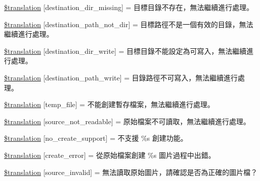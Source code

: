\begin{DoxyCompactItemize}
\item 
\hyperlink{class_8upload_8zh___t_w_8php_a9ef28d3cf09942c6c0a1e77fa09185e8}{\$translation} \mbox{[}\textquotesingle{}destination\+\_\+dir\+\_\+missing\textquotesingle{}\mbox{]} = \textquotesingle{}目標目錄不存在，無法繼續進行處理。\textquotesingle{}
\item 
\hyperlink{class_8upload_8zh___t_w_8php_a5704a67137126e8c87b7a364175929d4}{\$translation} \mbox{[}\textquotesingle{}destination\+\_\+path\+\_\+not\+\_\+dir\textquotesingle{}\mbox{]} = \textquotesingle{}目標路徑不是一個有效的目錄，無法繼續進行處理。\textquotesingle{}
\item 
\hyperlink{class_8upload_8zh___t_w_8php_a97608ea194a616db49141a0e6dee900c}{\$translation} \mbox{[}\textquotesingle{}destination\+\_\+dir\+\_\+write\textquotesingle{}\mbox{]} = \textquotesingle{}目標目錄不能設定為可寫入，無法繼續進行處理。\textquotesingle{}
\item 
\hyperlink{class_8upload_8zh___t_w_8php_a40e4e1962226b89fd76da5819a9602b0}{\$translation} \mbox{[}\textquotesingle{}destination\+\_\+path\+\_\+write\textquotesingle{}\mbox{]} = \textquotesingle{}目錄路徑不可寫入，無法繼續進行處理。\textquotesingle{}
\item 
\hyperlink{class_8upload_8zh___t_w_8php_a2baece8da11e20d45175db91851ec3e3}{\$translation} \mbox{[}\textquotesingle{}temp\+\_\+file\textquotesingle{}\mbox{]} = \textquotesingle{}不能創建暫存檔案，無法繼續進行處理。\textquotesingle{}
\item 
\hyperlink{class_8upload_8zh___t_w_8php_a922967ca2df0efdd455261142d8e5715}{\$translation} \mbox{[}\textquotesingle{}source\+\_\+not\+\_\+readable\textquotesingle{}\mbox{]} = \textquotesingle{}原始檔案不可讀取，無法繼續進行處理。\textquotesingle{}
\item 
\hyperlink{class_8upload_8zh___t_w_8php_a346dfd1ade29f583dd20d345c436859f}{\$translation} \mbox{[}\textquotesingle{}no\+\_\+create\+\_\+support\textquotesingle{}\mbox{]} = \textquotesingle{}不支援 \%s 創建功能。\textquotesingle{}
\item 
\hyperlink{class_8upload_8zh___t_w_8php_a53013ce9255c4e1849098ddd9fdb2b3f}{\$translation} \mbox{[}\textquotesingle{}create\+\_\+error\textquotesingle{}\mbox{]} = \textquotesingle{}從原始檔案創建 \%s 圖片過程中出錯。\textquotesingle{}
\item 
\hyperlink{class_8upload_8zh___t_w_8php_a6ab0a660b457eaf2d3434b225449fdd6}{\$translation} \mbox{[}\textquotesingle{}source\+\_\+invalid\textquotesingle{}\mbox{]} = \textquotesingle{}無法讀取原始圖片，請確認是否為正確的圖片檔？\textquotesingle{}

\end{DoxyCompactItemize}
